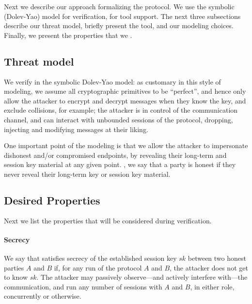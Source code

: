 Next we describe our approach  formalizing the \mEdhoc{} protocol. We use the
symbolic (Dolev-Yao) model for verification,  \mTamarin{} for tool support.
%
The next three subsections describe our threat model, briefly present the
\mTamarin{} tool, and our modeling choices.
%
Finally, we present the properties that we .

\subsection{Threat model}\label{sec:threat-model}
We verify \mEdhoc{} in the symbolic Dolev-Yao model: as customary in this style of
modeling, we assume all cryptographic primitives to be ``perfect'', and hence
only allow the attacker to encrypt and decrypt messages when they know the key,
and exclude  collisions, for example; the attacker is  in control of the
communication channel, and can interact with unbounded sessions of the protocol,
dropping, injecting and modifying messages at their liking.

One important point of the modeling is that we allow the attacker to impersonate
dishonest and/or compromised endpoints, by revealing their long-term and session
key material at any given point.
%
, we say that a party is honest if they never reveal their
long-term key or session key material.


\subsection{Desired Properties}
\label{sec:desired-properties}
Next we list the properties that will be considered during verification.

\paragraph{Secrecy}
We say that  \mEdhoc{} satisfies secrecy of the established session key $sk$
between two honest parties $A$ and $B$ if, for any run of the protocol $A$ and
$B$, the attacker does not get to know $sk$.
%
The attacker may passively observe---and actively interfere with---the
communication, and run any number of sessions with $A$ and $B$, in either role,
concurrently or otherwise.

